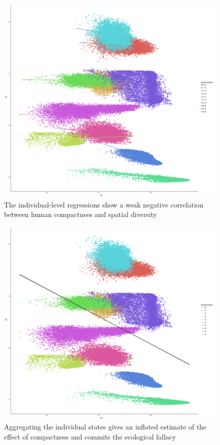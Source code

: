 \documentclass[]{article}
\begin{document}
\begin{figure}
\centering
\includegraphics{../30_results/individual_regressions.png}
\caption{The individual-level regressions show a weak negative
correlation between human compactness and spatial
diversity\label{indiv_reg}}
\end{figure}

\begin{figure}
\centering
\includegraphics{../30_results/grouped_regressions.png}
\caption{Aggregating the individual states gives an inflated estimate of
the effect of compactness and commits the ecological fallacy
\label{grouped_reg}}
\end{figure}
\end{document}
